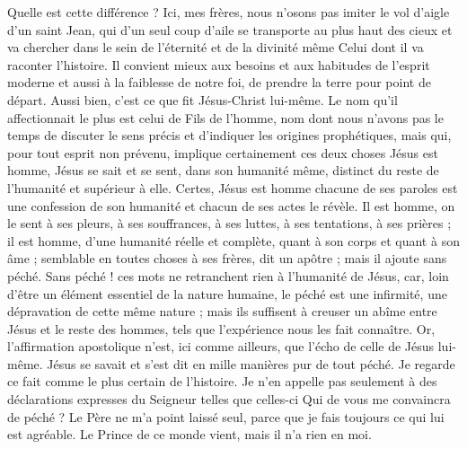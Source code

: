 Quelle est cette différence ? Ici, mes frères, nous n’osons pas imiter le vol d’aigle d’un saint Jean, qui d’un seul coup d’aile se transporte au plus haut des cieux et va chercher dans le sein de l’éternité et de la divinité même Celui dont il va raconter l’histoire. Il convient mieux aux besoins et aux habitudes de l’esprit moderne et aussi à la faiblesse de notre foi, de prendre la terre pour point de départ. Aussi bien, c’est ce que fit Jésus-Christ lui-même. Le nom qu’il affectionnait le plus est celui de Fils de l’homme, nom dont nous n’avons pas le temps de discuter le sens précis et d’indiquer les origines prophétiques, mais qui, pour tout esprit non prévenu, implique certainement ces deux choses\frcolon{} Jésus est homme, Jésus se sait et se sent, dans son humanité même, distinct du reste de l’humanité et supérieur à elle.
Certes, Jésus est homme\frcolon{} chacune de ses paroles est une confession de son humanité et chacun de ses actes le révèle. Il est homme, on le sent à ses pleurs, à ses souffrances, à ses luttes, à ses tentations, à ses prières ; il est homme, d’une humanité réelle et complète, quant à son corps et quant à son âme ; \Og{} semblable en toutes choses à ses frères\Fg{}, dit un apôtre ; mais il ajoute\frcolon{} \Og{} sans péché\Fg{}.
Sans péché ! ces mots ne retranchent rien à l’humanité de Jésus, car, loin d’être un élément essentiel de la nature humaine, le péché est une infirmité, une dépravation de cette même nature ; mais ils suffisent à creuser un abîme entre Jésus et le reste des hommes, tels que l’expérience nous les fait connaître. Or, l’affirmation apostolique n’est, ici comme ailleurs, que l’écho de celle de Jésus lui-même.
Jésus se savait et s’est dit en mille manières pur de tout péché.
Je regarde ce fait comme le plus certain de l’histoire.
Je n’en appelle pas seulement à des déclarations expresses du Seigneur telles que celles-ci\frcolon{} \Og{} Qui de vous me convaincra de péché ? \ocadr{} Le Père ne m’a point laissé seul, parce que je fais toujours ce qui lui est agréable. \ocadr{} Le Prince de ce monde vient, mais il n’a rien en moi.\Fg{}

